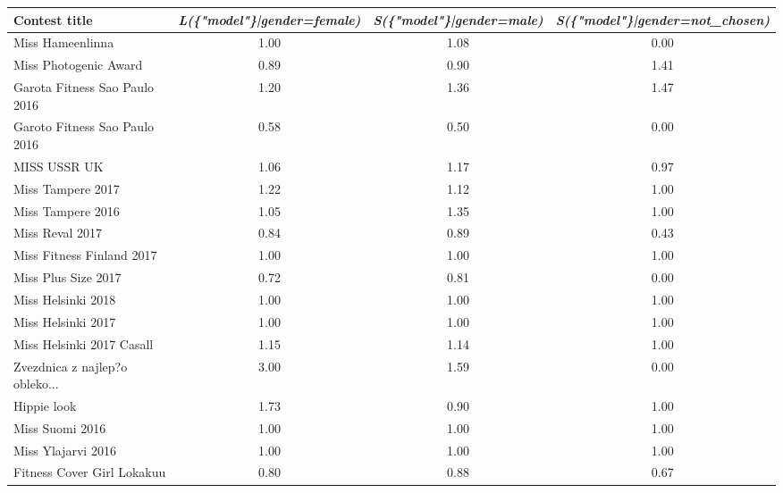 \documentclass[english]{tktltiki}
\begin{document}
\clearpage
{}
\begin{table}[H]
    \centering
    \begin{adjustbox}{width=1\textwidth}
    \begin{tabular}{lccc}
        \toprule
        \textbf{Contest title} & \textbf{\emph{L(\{"model"\}|gender=female)}} & \textbf{\emph{S(\{"model"\}|gender=male)}} & \textbf{\emph{S(\{"model"\}|gender=not\_chosen)}} \\
        \midrule
                                  Miss Hameenlinna &  1.00 &  1.08 &    0.00 \\
                             Miss Photogenic Award &  0.89 &  0.90 &    1.41 \\
                     Garota Fitness Sao Paulo 2016 &  1.20 &  1.36 &    1.47 \\
                     Garoto Fitness Sao Paulo 2016 &  0.58 &  0.50 &    0.00 \\
                                      MISS USSR UK &  1.06 &  1.17 &    0.97 \\
                                 Miss Tampere 2017 &  1.22 &  1.12 &    1.00 \\
                                 Miss Tampere 2016 &  1.05 &  1.35 &    1.00 \\
                                   Miss Reval 2017 &  0.84 &  0.89 &    0.43 \\
                         Miss Fitness Finland 2017 &  1.00 &  1.00 &    1.00 \\
                               Miss Plus Size 2017 &  0.72 &  0.81 &    0.00 \\
                                Miss Helsinki 2018 &  1.00 &  1.00 &    1.00 \\
                                Miss Helsinki 2017 &  1.00 &  1.00 &    1.00 \\
                         Miss Helsinki 2017 Casall &  1.15 &  1.14 &    1.00 \\
                Zvezdnica z najlep?o obleko... &  3.00 &  1.59 &    0.00 \\
                                       Hippie look &  1.73 &  0.90 &    1.00 \\
                                   Miss Suomi 2016 &  1.00 &  1.00 &    1.00 \\
                                Miss Ylajarvi 2016 &  1.00 &  1.00 &    1.00 \\
                        Fitness Cover Girl Lokakuu &  0.80 &  0.88 &    0.67 \\

\end{tabular}
\end{adjustbox}
\end{table}
\end{document}
